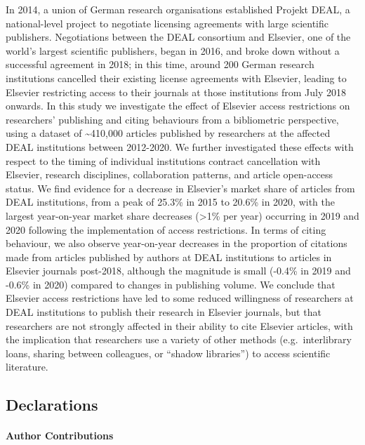 \documentclass[
]{article}
\begin{document}
In 2014, a union of German research organisations established Projekt DEAL, a national-level project to negotiate licensing agreements with large scientific publishers. Negotiations between the DEAL consortium and Elsevier, one of the world's largest scientific publishers, began in 2016, and broke down without a successful agreement in 2018; in this time, around 200 German research institutions cancelled their existing license agreements with Elsevier, leading to Elsevier restricting access to their journals at those institutions from July 2018 onwards. In this study we investigate the effect of Elsevier access restrictions on researchers' publishing and citing behaviours from a bibliometric perspective, using a dataset of \textasciitilde410,000 articles published by researchers at the affected DEAL institutions between 2012-2020. We further investigated these effects with respect to the timing of individual institutions contract cancellation with Elsevier, research disciplines, collaboration patterns, and article open-access status. We find evidence for a decrease in Elsevier's market share of articles from DEAL institutions, from a peak of 25.3\% in 2015 to 20.6\% in 2020, with the largest year-on-year market share decreases (\textgreater1\% per year) occurring in 2019 and 2020 following the implementation of access restrictions. In terms of citing behaviour, we also observe year-on-year decreases in the proportion of citations made from articles published by authors at DEAL institutions to articles in Elsevier journals post-2018, although the magnitude is small (-0.4\% in 2019 and -0.6\% in 2020) compared to changes in publishing volume. We conclude that Elsevier access restrictions have led to some reduced willingness of researchers at DEAL institutions to publish their research in Elsevier journals, but that researchers are not strongly affected in their ability to cite Elsevier articles, with the implication that researchers use a variety of other methods (e.g.~interlibrary loans, sharing between colleagues, or ``shadow libraries'') to access scientific literature.

\hypertarget{declarations}{%
\subsection{Declarations}\label{declarations}}

\hypertarget{author-contributions}{%
\paragraph{Author Contributions}\label{author-contributions}}
\end{document}

